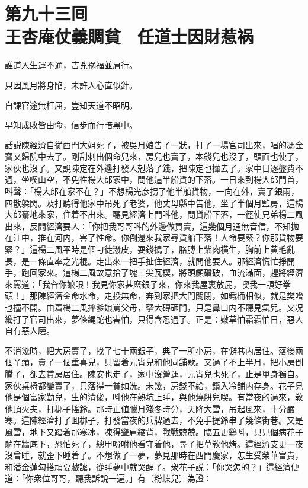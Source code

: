
\chapter*{第九十三囘　\\王杏庵仗義賙貧　任道士因財惹祸}


\begin{myquote}
誰道人生運不通，吉兇祸福並肩行。

只因風月將身陷，未許人心直似針。

自課官途無枉屈，豈知天道不昭明。

早知成敗皆由命，信步而行暗黑中。
\end{myquote}

話説陳經濟自従西門大姐死了，被吳月娘告了一狀，打了一場官司出來，唱的馮金寳又歸院中去了。剛刮剌出個命兒來，房兒也賣了，本錢兒也沒了，頭面也使了，家伙也沒了。又說陳定在外邊打發人尅落了錢，把陳定也攆去了。家中日逐盤費不週，坐喫山空，不免徃楊大郎家中，問他這半船貨的下落。一日來到楊大郎門首，呌聲：「楊大郎在家不在？」不想楊光彦拐了他半船貨物，一向在外，賣了銀兩，四散躱閃。及打聽得他家中吊死了老婆，他丈母縣中告他，坐了半個月監房，這楊大郎驀地來家，住着不出來。聽見經濟上門呌他，問貨船下落，一徑使兄弟楊二風出來，反問經濟要人：「你把我哥哥呌的外邊做買賣，這幾個月通無音信，不知拋在江中，推在河内，害了性命。你倒還來我家尋貨船下落！人命要緊？你那貨物要緊？」這楊二風平時是個刁徒潑皮，耍錢搗子，胳膊上紫肉横生，胸前上黄毛亂長，是一條直率之光棍。走出來一把手扯住經濟，就問他要人。那經濟慌忙掙開手，跑回家來。這楊二風故意拾了塊三尖瓦楔，將頭顱礸破，血流滿面，趕將經濟來罵道：「我㒲你娘眼！我見你家甚麽銀子來，你來我屋裏放屁，喫我一頓好拳頭！」那陳經濟金命水命，走投無命，奔到家把大門關閉，如鐵桶相似，就是樊噲也撞不開。由着楊二風摔爹娘罵父母，拏大磚砸門，只是鼻口内不聽見氣兒。又况纔打了官司出來，夢條䋲蛇也害怕，只得含忍過了。正是：嫩草怕霜霜怕日，惡人自有惡人磨。

不消幾時，把大房賣了，找了七十兩銀子，典了一所小房，在僻巷内居住。落後兩個丫頭，賣了一個重喜兒，只留着元宵兒和他同舖歇。又過了不上半月，把小房倒騰了，卻去賃房居住。陳安也走了，家中沒營運，元宵兒也死了，止是單身獨自。家伙桌椅都變賣了，只落得一貧如洗。未幾，房錢不給，鑽入冷舖内存身。花子見他是個富家勤兒，生的清俊，呌他在熱坑上睡，與他燒餅兒喫。有當夜的過來，敎他頂火夫，打梆子搖鈴。那時正値臘月殘冬時分，天降大雪，吊起風來，十分嚴寒。這陳經濟打了囬梆子，打發當夜的兵牌過去，不免手提鈴串了幾條街巷。又是風雪，地下又踏着那寒冰，凍得聳肩縮背，戰戰兢兢。臨五更鷄呌，只見個病花子躺在牆底下，恐怕死了，總甲吩咐他看守着他，尋了把草敎他烤。這經濟支更一夜沒曾睡，就歪下睡着了。不想做了一夢，夢見那時在西門慶家，怎生受榮華富貴，和潘金蓮勾搭頑耍戯謔，從睡夢中就哭醒了。衆花子説：「你哭怎的？」這經濟便道：「你衆位哥哥，聽我訴說一遍。」有〔粉蝶兒〕為證：

